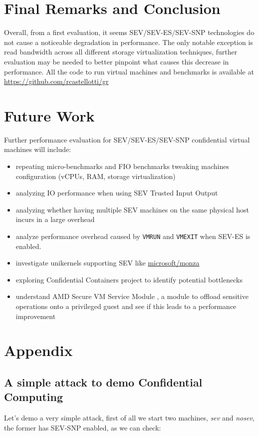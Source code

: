 \documentclass[twocolumn]{article}
\begin{document}
\section{Final Remarks and Conclusion}
Overall, from a first evaluation, it seems SEV/SEV-ES/SEV-SNP technologies do not cause a noticeable degradation in performance. The only notable exception is read bandwidth across all different storage virtualization techniques, further evaluation may be needed to better pinpoint what causes this decrease in performance.
All the code to run virtual machines and benchmarks is available at \href{https://github.com/rcastellotti/gr}{https://github.com/rcastellotti/gr}

\section{Future Work}
Further performance evaluation for SEV/SEV-ES/SEV-SNP confidential virtual machines will include:

\begin{itemize}
    \item repeating micro-benchmarks and FIO benchmarks tweaking machines configuration (vCPUs, RAM, storage virtualization)
    \item analyzing IO performance when using SEV Trusted Input Output \cite{tio}
    \item analyzing whether having multiple SEV machines on the same physical host incurs in a large overhead
    \item analyze performance overhead caused by \texttt{VMRUN} and \texttt{VMEXIT} when SEV-ES is enabled.
    \item investigate unikernels supporting SEV like \href{https://github.com/microsoft/monza}{microsoft/monza}
    \item exploring Confidential Containers \cite{coco} project to identify potential bottlenecks
    \item understand AMD Secure VM Service Module \cite{svsm}, a module to offload sensitive operations onto a privileged guest and see if this leads to a performance improvement
\end{itemize}

    
\printbibliography
\appendix

\section{Appendix}
\label{demoattack}
\subsection{A simple attack to demo Confidential Computing}
Let's demo a very simple attack, first of all we start two machines, \textit{sev} and \textit{nosev}, the former has SEV-SNP enabled, as we can check:
\end{document}
